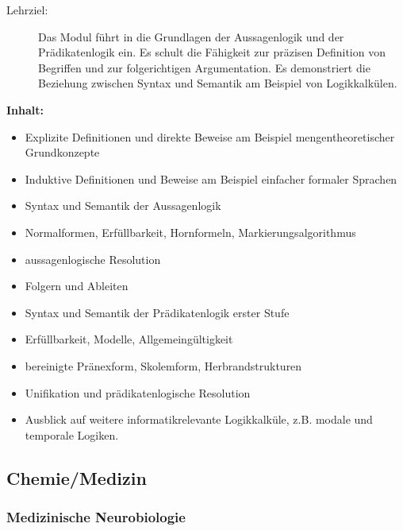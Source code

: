 \documentclass[%
a4paper, %
11pt,               %
leqno,              %
fleqn,              %
]
{scrartcl}
\begin{document}
\begin{description}
  \item[Lehrziel:] Das Modul führt in die Grundlagen der Aussagenlogik und der
    Prädikatenlogik ein. Es schult die Fähigkeit zur präzisen Definition von
    Begriffen und zur folgerichtigen Argumentation. Es demonstriert die
    Beziehung zwischen Syntax und Semantik am Beispiel von Logikkalkülen.
\end{description}
\textsf{\textbf{Inhalt:}}
\begin{itemize}\itemsep0pt
  \item Explizite Definitionen und direkte Beweise am Beispiel
    mengentheoretischer Grundkonzepte
  \item Induktive Definitionen und Beweise am Beispiel einfacher formaler
    Sprachen
  \item Syntax und Semantik der Aussagenlogik
  \item Normalformen, Erfüllbarkeit, Hornformeln, Markierungsalgorithmus
  \item aussagenlogische Resolution
  \item Folgern und Ableiten
  \item Syntax und Semantik der Prädikatenlogik erster Stufe
  \item Erfüllbarkeit, Modelle, Allgemeingültigkeit
  \item bereinigte Pränexform, Skolemform, Herbrandstrukturen
  \item Unifikation und prädikatenlogische Resolution
  \item Ausblick auf weitere informatikrelevante Logikkalküle, z.B. modale und
    temporale Logiken.
\end{itemize}



\subsection{Chemie/Medizin} %
\label{sub:Chemie/Medizin}

\subsubsection{Medizinische Neurobiologie} %
\label{ssub:Medizinische Neurobiologie}
\end{document}
